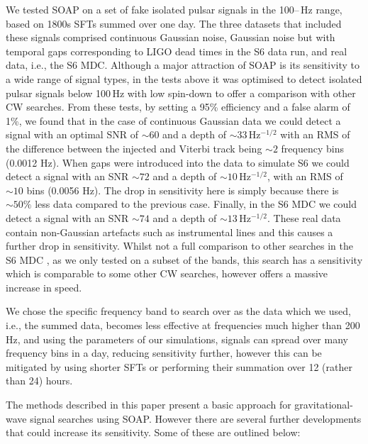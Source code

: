%
%
We tested SOAP on a set of fake isolated pulsar signals in the
100\;--\,Hz range, based on 1800s \glspl{SFT} summed over one day.
The three datasets that included these signals comprised continuous Gaussian noise, Gaussian noise but with temporal gaps corresponding to LIGO dead times in the S6 data run, and real data, i.e., the
S6 \gls{MDC}. Although a major attraction of SOAP is its sensitivity to a wide
range of signal types, in the tests above it was optimised to detect isolated pulsar signals below 100\,Hz with low spin-down to offer a comparison with other \gls{CW} searches. From these tests, by setting a
95\% efficiency and a false alarm of 1\%, we found that in the case of  continuous Gaussian data we could detect a signal with an optimal \gls{SNR} of $\sim 60$ and a
depth of $\sim 33$\,Hz$^{-1/2}$ with an \gls{RMS} of the difference between the injected and Viterbi track being $\sim 2$ frequency bins (0.0012 Hz).
When gaps were introduced into the data to simulate S6 we could detect a signal with an
\gls{SNR} $\sim 72$  and a depth of $\sim 10$\,Hz$^{-1/2}$, with an \gls{RMS} of $\sim 10$ bins (0.0056 Hz). The drop in sensitivity here is simply because  there is $\sim 50 \%$ less data compared to the previous case. Finally, in the S6 \gls{MDC} we could
detect a signal with an \gls{SNR} $\sim 74$ and a depth of $\sim
13$\,Hz$^{-1/2}$.
These real data contain non-Gaussian artefacts such as instrumental lines and this causes a further drop in sensitivity.
Whilst not a full comparison to other searches in the S6 \gls{MDC} \citep{walsh2016ComparisonMethods}, as we only tested on a subset
of the bands, this search has a sensitivity which is comparable to some other \gls{CW} searches, however offers a massive increase in speed.

We chose the specific frequency band to search over as the data which we used, i.e., the summed data, becomes less effective at frequencies much higher than 200\,Hz, and using the parameters of our simulations, signals can spread over many frequency bins in a day, reducing sensitivity further, however this can be mitigated by using shorter \glspl{SFT} or performing their summation over 12 (rather than 24) hours.

%
%
The methods described in this paper present a basic approach for gravitational-wave signal searches using SOAP. However there are several further developments that could increase its sensitivity. Some of these are outlined below:

